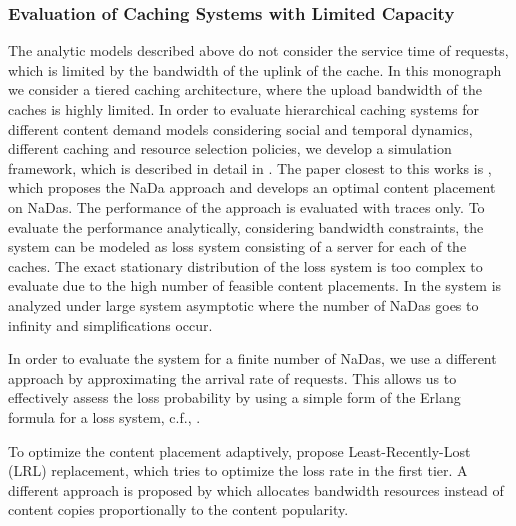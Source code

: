 \subsubsection{Evaluation of Caching Systems with Limited Capacity}

The analytic models described above do not consider the service time of requests, which is limited by the bandwidth of the uplink of the cache.
In this monograph we consider a tiered caching architecture, where the upload bandwidth of the caches is highly limited.
In order to evaluate hierarchical caching systems for different content demand models considering social and temporal dynamics, different caching and resource selection policies, we develop a simulation framework, which is described in detail in .
The paper closest to this works is \cite{valancius2009greening}, which proposes the NaDa approach and develops an optimal content placement on NaDas.
The performance of the approach is evaluated with traces only.
To evaluate the performance analytically, considering bandwidth constraints, the system can be modeled as loss system consisting of a server for each of the caches.
The exact stationary distribution of the loss system is too complex to evaluate due to the high number of feasible content placements.
In \cite{tan2013optimal} the system is analyzed under large system asymptotic where the number of NaDas goes to infinity and simplifications occur.

In order to evaluate the system for a finite number of NaDas, we use a different approach by approximating the arrival rate of requests.
This allows us to effectively assess the loss probability by using a simple form of the Erlang formula for a loss system, c.f., .

To optimize the content placement adaptively, \cite{leconte2014adaptive} propose Least-Recently-Lost (LRL) replacement, which tries to optimize the loss rate in the first tier.
A different approach is proposed by \cite{zhou2015unifying} which allocates bandwidth resources instead of content copies proportionally to the content popularity.
